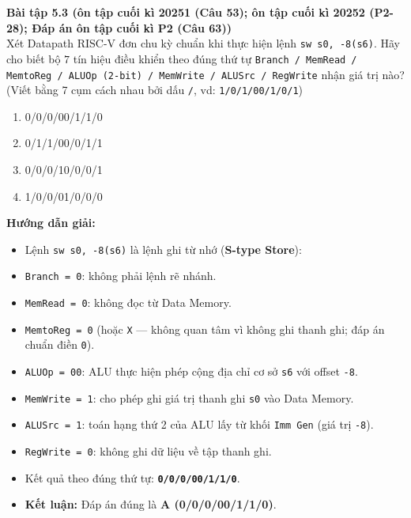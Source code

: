 \textbf{Bài tập 5.3 (ôn tập cuối kì 20251 (Câu 53); ôn tập cuối kì 20252 (P2-28); Đáp án ôn tập cuối kì P2 (Câu 63))}\\
Xét Datapath RISC-V đơn chu kỳ chuẩn khi thực hiện lệnh \texttt{sw s0, -8(s6)}. Hãy cho biết bộ $7$ tín hiệu điều khiển theo đúng thứ tự \texttt{Branch / MemRead / MemtoReg / ALUOp (2-bit) / MemWrite / ALUSrc / RegWrite} nhận giá trị nào? (Viết bằng 7 cụm cách nhau bởi dấu \texttt{/}, vd: \texttt{1/0/1/00/1/0/1})
\begin{enumerate}[label=\Alph*.]
    \item 0/0/0/00/1/1/0
    \item 0/1/1/00/0/1/1
    \item 0/0/0/10/0/0/1
    \item 1/0/0/01/0/0/0
\end{enumerate}
\textbf{Hướng dẫn giải:}
\begin{itemize}
    \item Lệnh \texttt{sw s0, -8(s6)} là lệnh ghi từ nhớ (\textbf{S-type Store}):
    \item \texttt{Branch = 0}: không phải lệnh rẽ nhánh.
    \item \texttt{MemRead = 0}: không đọc từ Data Memory.
    \item \texttt{MemtoReg = 0} (hoặc \texttt{X} --- không quan tâm vì không ghi thanh ghi; đáp án chuẩn điền \texttt{0}).
    \item \texttt{ALUOp = 00}: ALU thực hiện phép cộng địa chỉ cơ sở \texttt{s6} với offset \texttt{-8}.
    \item \texttt{MemWrite = 1}: cho phép ghi giá trị thanh ghi \texttt{s0} vào Data Memory.
    \item \texttt{ALUSrc = 1}: toán hạng thứ 2 của ALU lấy từ khối \texttt{Imm Gen} (giá trị \texttt{-8}).
    \item \texttt{RegWrite = 0}: không ghi dữ liệu về tập thanh ghi.
    \item Kết quả theo đúng thứ tự: \textbf{\texttt{0/0/0/00/1/1/0}}.
    \item \textbf{Kết luận:} Đáp án đúng là \textbf{A (0/0/0/00/1/1/0)}.
\end{itemize}

